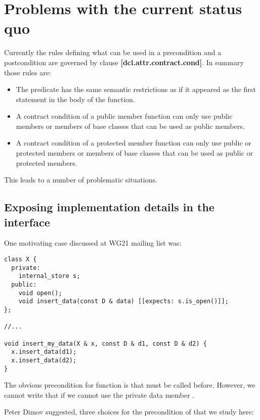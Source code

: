 \section{Problems with the current status quo}

Currently the rules defining what can be used in a precondition and a
postcondition are governed by clause \textbf{[dcl.attr.contract.cond]}.
In summary those rules are:

\begin{itemize}

\item The predicate has the same semantic restrictions as if it appeared as the
first statement in the body of the function.

\item A contract condition of a public member function can only use public
members or members of base classes that can be used as public members.

\item A contract condition of a protected member function can only use public or
protected members or members of base classes that can be used as public or
protected members.

\end{itemize}

This leads to a number of problematic situations.

\subsection{Exposing implementation details in the interface}

One motivating case discussed at WG21 mailing list was:

\begin{lstlisting}
class X {
  private:
    internal_store s;
  public:
    void open();
    void insert_data(const D & data) [[expects: s.is_open()]];
};

//...

void insert_my_data(X & x, const D & d1, const D & d2) {
  x.insert_data(d1);
  x.insert_data(d2);
}
\end{lstlisting}

The obvious precondition for function  is that
 must be called before. However, we cannot write that if we
cannot use the private data member .

Peter Dimov suggested, three choices for the precondition of
 that we study here:

